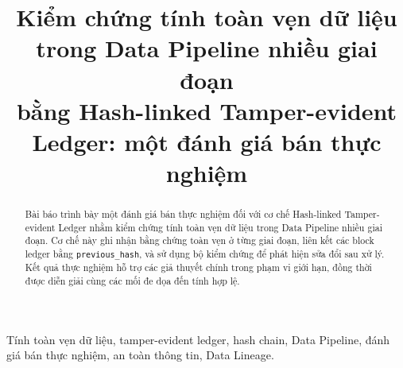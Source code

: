 \documentclass[conference]{IEEEtran}
\title{Kiểm chứng tính toàn vẹn dữ liệu trong Data Pipeline nhiều giai đoạn\\
bằng Hash-linked Tamper-evident Ledger: một đánh giá bán thực nghiệm}
\author{
\IEEEauthorblockN{Nguyễn Ngọc Sơn}
\IEEEauthorblockA{Học viện Kỹ thuật Mật mã\\
Email: CHAT4P016@actvn.edu.vn}
}
\begin{document}
\maketitle

\begin{abstract}
Bài báo trình bày một đánh giá bán thực nghiệm đối với cơ chế Hash-linked
Tamper-evident Ledger nhằm kiểm chứng tính toàn vẹn dữ liệu trong Data
Pipeline nhiều giai đoạn. Cơ chế này ghi nhận bằng chứng toàn vẹn ở từng
giai đoạn, liên kết các block ledger bằng \texttt{previous\_hash}, và sử
dụng bộ kiểm chứng để phát hiện sửa đổi sau xử lý. Kết quả thực nghiệm hỗ
trợ các giả thuyết chính trong phạm vi giới hạn, đồng thời được diễn giải
cùng các mối đe dọa đến tính hợp lệ.
\end{abstract}

\begin{IEEEkeywords}
Tính toàn vẹn dữ liệu, tamper-evident ledger, hash chain, Data Pipeline,
đánh giá bán thực nghiệm, an toàn thông tin, Data Lineage.
\end{IEEEkeywords}












\end{document}
